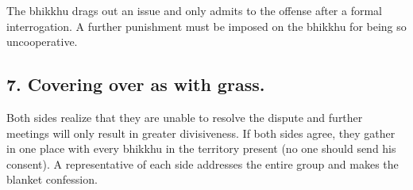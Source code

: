 The bhikkhu drags out an issue and only admits to the offense after a
formal interrogation. A further punishment must be imposed on the
bhikkhu for being so uncooperative.

\subsection{7. Covering over as with grass.}

Both sides realize that they are unable to resolve the dispute and
further meetings will only result in greater divisiveness. If both sides
agree, they gather in one place with every bhikkhu in the territory
present (no one should send his consent). A representative of each side
addresses the entire group and makes the blanket confession.

